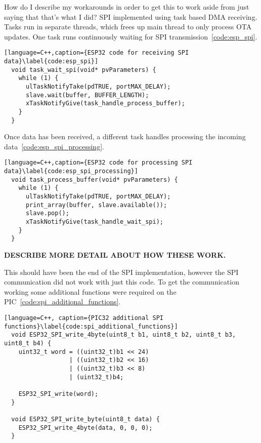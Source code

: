 How do I describe my workarounds in order to get this to work aside from just saying that that's what I did?
SPI implemented using task based DMA receiving.
Tasks run in separate threads, which frees up main thread to only process OTA updates.
One task runs continuously waiting for SPI transmission~\autoref{code:esp_spi}.

\begin{lstlisting}[language=C++,caption={ESP32 code for receiving SPI data}\label{code:esp_spi}]
  void task_wait_spi(void* pvParameters) {
    while (1) {
      ulTaskNotifyTake(pdTRUE, portMAX_DELAY);
      slave.wait(buffer, BUFFER_LENGTH);
      xTaskNotifyGive(task_handle_process_buffer);
    }
  }
\end{lstlisting}

Once data has been received, a different task handles processing the incoming data~\autoref{code:esp_spi_processing}.

\begin{lstlisting}[language=C++,caption={ESP32 code for processing SPI data}\label{code:esp_spi_processing}]
  void task_process_buffer(void* pvParameters) {
    while (1) {
      ulTaskNotifyTake(pdTRUE, portMAX_DELAY);
      print_array(buffer, slave.available());
      slave.pop();
      xTaskNotifyGive(task_handle_wait_spi);
    }
  }
\end{lstlisting}

\textbf{DESCRIBE MORE DETAIL ABOUT HOW THESE WORK.}

This should have been the end of the SPI implementation,
however the SPI communication did not work with just this code.
To get the communication working some additional functions were required on the PIC~\autoref{code:spi_additional_functions}.

\begin{lstlisting}[language=C++, caption={PIC32 additional SPI functions}\label{code:spi_additional_functions}]
  void ESP32_SPI_write_4byte(uint8_t b1, uint8_t b2, uint8_t b3, uint8_t b4) {
    uint32_t word = ((uint32_t)b1 << 24)
                  | ((uint32_t)b2 << 16)
                  | ((uint32_t)b3 << 8)
                  | (uint32_t)b4;

    ESP32_SPI_write(word);
  }

  void ESP32_SPI_write_byte(uint8_t data) {
    ESP32_SPI_write_4byte(data, 0, 0, 0);
  }
\end{lstlisting}

